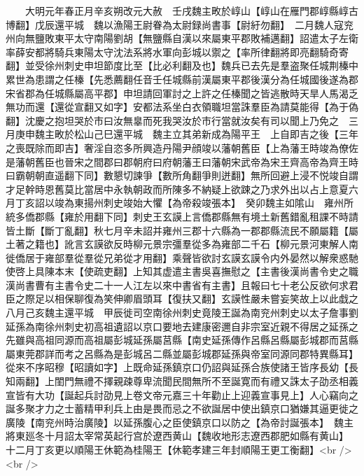 　　大明元年春正月辛亥朔改元大赦　壬戌魏主畋於崞山【崞山在雁門郡崞縣崞古博翻】戊辰還平城　魏以漁陽王尉眷為太尉録尚書事【尉紆勿翻】　二月魏人寇兖州向無鹽敗東平太守南陽劉胡【無鹽縣自漢以來屬東平郡敗補邁翻】詔遣太子左衛率薛安都將騎兵東陽太守沈法系將水軍向彭城以禦之【率所律翻將即亮翻騎奇寄翻】並受徐州刺史申坦節度比至【比必利翻及也】魏兵已去先是羣盗聚任城荆榛中累世為患謂之任榛【先悉薦翻任音壬任城縣前漢屬東平郡後漢分為任城國後遂為郡宋省郡為任城縣屬高平郡】申坦請回軍討之上許之任榛聞之皆逃散時天旱人馬渴乏無功而還【還從宣翻又如字】安都法系坐白衣領職坦當誅羣臣為請莫能得【為于偽翻】沈慶之抱坦哭於市曰汝無辠而死我哭汝於市行當就汝矣有司以聞上乃免之　三月庚申魏主畋於松山己巳還平城　魏主立其弟新成為陽平王　上自即吉之後【三年之喪既除而即吉】奢淫自恣多所興造丹陽尹顔竣以藩朝舊臣【上為藩王時竣為僚佐是藩朝舊臣也晉宋之間郡曰郡朝府曰府朝藩王曰藩朝宋武帝為宋王齊高帝為齊王時曰霸朝朝直遥翻下同】數懇切諫爭【數所角翻爭則迸翻】無所回避上浸不悦竣自謂才足幹時恩舊莫比當居中永執朝政而所陳多不納疑上欲踈之乃求外出以占上意夏六月丁亥詔以竣為東揚州刺史竣始大懼【為帝殺竣張本】　癸卯魏主如隂山　雍州所統多僑郡縣【雍於用翻下同】刺史王玄謨上言僑郡縣無有境土新舊錯亂租課不時請皆土斷【斷丁亂翻】秋七月辛未詔并雍州三郡十六縣為一郡郡縣流民不願屬籍【屬土著之籍也】訛言玄謨欲反時柳元景宗彊羣從多為雍部二千石【柳元景河東解人南徙僑居于雍部羣從羣從兄弟從才用翻】乘聲皆欲討玄謨玄謨令内外晏然以解衆惑馳使啓上具陳本末【使疏吏翻】上知其虚遣主書吳喜撫慰之【主書後漢尚書令史之職漢尚書曹有主書令史二十一人江左以來中書省有主書】且報曰七十老公反欲何求君臣之際足以相保聊復為笑伸卿眉頭耳【復扶又翻】玄謨性嚴未嘗妄笑故上以此戱之　八月己亥魏主還平城　甲辰徙司空南徐州刺史竟陵王誕為南兖州刺史以太子詹事劉延孫為南徐州刺史初高祖遺詔以京口要地去建康密邇自非宗室近親不得居之延孫之先雖與高祖同源而高祖屬彭城延孫屬莒縣【南史延孫傳作呂縣呂縣屬彭城郡而莒縣屬東莞郡詳而考之呂縣為是彭城呂二縣並屬彭城郡延孫與帝室同源同郡特異縣耳】從來不序昭穆【昭讀如字】上既命延孫鎮京口仍詔與延孫合族使諸王皆序長幼【長知兩翻】上閨門無禮不擇親疎尊卑流聞民間無所不至誕寛而有禮又誅太子劭丞相義宣皆有大功【誕起兵討劭見上卷文帝元嘉三十年勸止上迎義宣事見上】人心竊向之誕多聚才力之士蓄精甲利兵上由是畏而忌之不欲誕居中使出鎮京口猶嫌其逼更徙之廣陵【南兖州時治廣陵】以延孫腹心之臣使鎮京口以防之【為帝討誕張本】　魏主將東廵冬十月詔太宰常英起行宫於遼西黄山【魏收地形志遼西郡肥如縣有黄山】　十二月丁亥更以順陽王休範為桂陽王【休範孝建三年封順陽王更工衡翻】<br />
<br />
